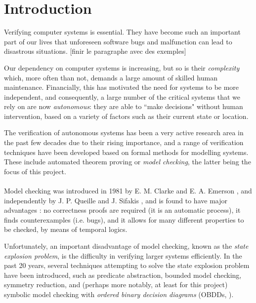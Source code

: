 \documentclass[11pt]{report}
\begin{document}
\tableofcontents
\clearpage
\begin{abstract}

\end{abstract}

\chapter{Introduction}

Verifying computer systems is essential. They have become such an important part of our lives that unforeseen software bugs and malfunction can lead to disastrous situations. [finir le paragraphe avec des exemples] 

Our dependency on computer systems is increasing, but so is their \textit{complexity} which, more often than not, demands a large amount of skilled human maintenance. Financially, this has motivated the need for systems to be more independent, and consequently, a large number of the critical systems that we rely on are now \textit{autonomous}: they are able to ``make decisions" without human intervention, based on a variety of factors such as their current state or location. 

The verification of autonomous systems has been a very active research area in the past few decades due to their rising importance, and a range of verification techniques have been developed based on formal methods for modelling systems. These include automated theorem proving or \textit{model checking}, the latter being the focus of this project.
\\\\

 Model checking was introduced in 1981 by E. M. Clarke and E. A. Emerson \cite{original_model_checking}, and independently by J. P. Queille and J. Sifakis \cite{symbolic_model_checking}, and is found to have major advantages \cite{birth_of_model_checking}: no correctness proofs are required (it is an automatic process), it finds counterexamples (i.e. bugs), and it allows for many different properties to be checked, by means of temporal logics. 
 
Unfortunately, an important disadvantage of model checking, known as the \textit{state explosion problem}, is the difficulty in verifying larger systems efficiently. In the past 20 years, several techniques attempting to solve the state explosion problem have been introduced, such as predicate abstraction, bounded model checking, symmetry reduction, and (perhaps more notably, at least for this project) symbolic model checking with \textit{ordered binary decision diagrams} (OBDDs, \cite{bryant}).
\end{document}
